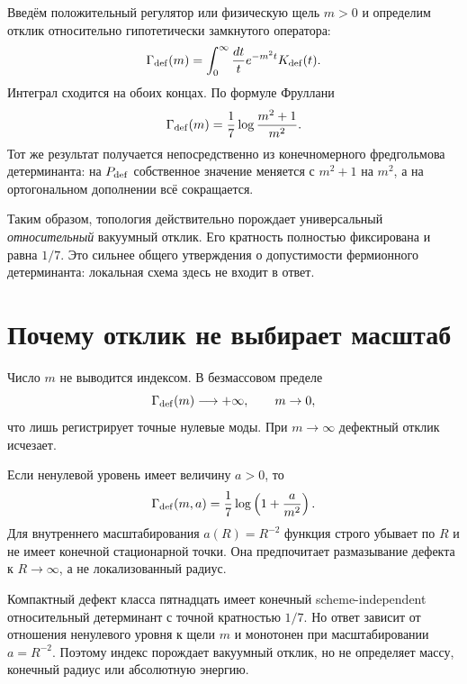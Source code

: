 Введём положительный регулятор или физическую щель $m>0$ и определим
отклик относительно гипотетически замкнутого оператора:
\begin{equation}
 \Gamma_{\rm def}(m)
 =\int_0^\infty\frac{dt}{t}e^{-m^2t}K_{\rm def}(t).
 \label{eq:v5-defect-proper-time-response}
\end{equation}
Интеграл сходится на обоих концах. По формуле Фруллани
\begin{equation}
 \Gamma_{\rm def}(m)
 =\frac17\log\frac{m^2+1}{m^2}.
 \label{eq:v5-defect-relative-determinant}
\end{equation}
Тот же результат получается непосредственно из конечномерного
фредгольмова детерминанта: на $P_{\rm def}$ собственное значение меняется
с $m^2+1$ на $m^2$, а на ортогональном дополнении всё сокращается.

Таким образом, топология действительно порождает универсальный
\emph{относительный} вакуумный отклик. Его кратность полностью фиксирована
и равна $1/7$. Это сильнее общего утверждения о допустимости фермионного
детерминанта: локальная схема здесь не входит в ответ.

\section{Почему отклик не выбирает масштаб}

Число $m$ не выводится индексом. В безмассовом пределе
\begin{equation}
 \Gamma_{\rm def}(m)\longrightarrow+\infty,
 \qquad m\to0,
\end{equation}
что лишь регистрирует точные нулевые моды. При $m\to\infty$ дефектный
отклик исчезает.

Если ненулевой уровень имеет величину $a>0$, то
\begin{equation}
 \Gamma_{\rm def}(m,a)
 =\frac17\log\left(1+\frac{a}{m^2}\right).
 \label{eq:v5-defect-response-general-gap}
\end{equation}
Для внутреннего масштабирования $a(R)=R^{-2}$ функция строго убывает по
$R$ и не имеет конечной стационарной точки. Она предпочитает размазывание
дефекта к $R\to\infty$, а не локализованный радиус.

\begin{theorem}
Компактный дефект класса пятнадцать имеет конечный scheme-independent
относительный детерминант с точной кратностью $1/7$. Но ответ зависит от
отношения ненулевого уровня к щели $m$ и монотонен при масштабировании
$a=R^{-2}$. Поэтому индекс порождает вакуумный отклик, но не определяет
массу, конечный радиус или абсолютную энергию.
\end{theorem}

